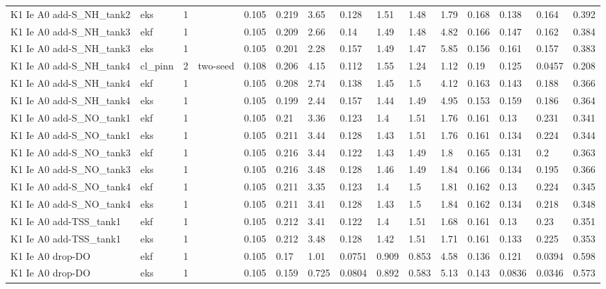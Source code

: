 \begin{table}[t]
\begin{tabular}{lllllllllllllll}
K1 Ie A0 add-S\_NH\_tank2 & eks & 1 &  & 0.105 & 0.219 & 3.65 & 0.128 & 1.51 & 1.48 & 1.79 & 0.168 & 0.138 & 0.164 & 0.392 \\
K1 Ie A0 add-S\_NH\_tank3 & ekf & 1 &  & 0.105 & 0.209 & 2.66 & 0.14 & 1.49 & 1.48 & 4.82 & 0.166 & 0.147 & 0.162 & 0.384 \\
K1 Ie A0 add-S\_NH\_tank3 & eks & 1 &  & 0.105 & 0.201 & 2.28 & 0.157 & 1.49 & 1.47 & 5.85 & 0.156 & 0.161 & 0.157 & 0.383 \\
K1 Ie A0 add-S\_NH\_tank4 & cl\_pinn & 2 & two-seed & 0.108 & 0.206 & 4.15 & 0.112 & 1.55 & 1.24 & 1.12 & 0.19 & 0.125 & 0.0457 & 0.208 \\
K1 Ie A0 add-S\_NH\_tank4 & ekf & 1 &  & 0.105 & 0.208 & 2.74 & 0.138 & 1.45 & 1.5 & 4.12 & 0.163 & 0.143 & 0.188 & 0.366 \\
K1 Ie A0 add-S\_NH\_tank4 & eks & 1 &  & 0.105 & 0.199 & 2.44 & 0.157 & 1.44 & 1.49 & 4.95 & 0.153 & 0.159 & 0.186 & 0.364 \\
K1 Ie A0 add-S\_NO\_tank1 & ekf & 1 &  & 0.105 & 0.21 & 3.36 & 0.123 & 1.4 & 1.51 & 1.76 & 0.161 & 0.13 & 0.231 & 0.341 \\
K1 Ie A0 add-S\_NO\_tank1 & eks & 1 &  & 0.105 & 0.211 & 3.44 & 0.128 & 1.43 & 1.51 & 1.76 & 0.161 & 0.134 & 0.224 & 0.344 \\
K1 Ie A0 add-S\_NO\_tank3 & ekf & 1 &  & 0.105 & 0.216 & 3.44 & 0.122 & 1.43 & 1.49 & 1.8 & 0.165 & 0.131 & 0.2 & 0.363 \\
K1 Ie A0 add-S\_NO\_tank3 & eks & 1 &  & 0.105 & 0.216 & 3.48 & 0.128 & 1.46 & 1.49 & 1.84 & 0.166 & 0.134 & 0.195 & 0.366 \\
K1 Ie A0 add-S\_NO\_tank4 & ekf & 1 &  & 0.105 & 0.211 & 3.35 & 0.123 & 1.4 & 1.5 & 1.81 & 0.162 & 0.13 & 0.224 & 0.345 \\
K1 Ie A0 add-S\_NO\_tank4 & eks & 1 &  & 0.105 & 0.211 & 3.41 & 0.128 & 1.43 & 1.5 & 1.84 & 0.162 & 0.134 & 0.218 & 0.348 \\
K1 Ie A0 add-TSS\_tank1 & ekf & 1 &  & 0.105 & 0.212 & 3.41 & 0.122 & 1.4 & 1.51 & 1.68 & 0.161 & 0.13 & 0.23 & 0.351 \\
K1 Ie A0 add-TSS\_tank1 & eks & 1 &  & 0.105 & 0.212 & 3.48 & 0.128 & 1.42 & 1.51 & 1.71 & 0.161 & 0.133 & 0.225 & 0.353 \\
K1 Ie A0 drop-DO & ekf & 1 &  & 0.105 & 0.17 & 1.01 & 0.0751 & 0.909 & 0.853 & 4.58 & 0.136 & 0.121 & 0.0394 & 0.598 \\
K1 Ie A0 drop-DO & eks & 1 &  & 0.105 & 0.159 & 0.725 & 0.0804 & 0.892 & 0.583 & 5.13 & 0.143 & 0.0836 & 0.0346 & 0.573 \\

\end{tabular}
\end{table}

